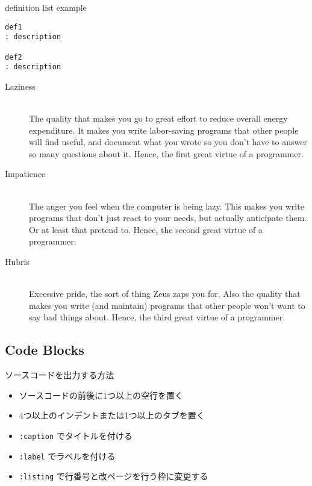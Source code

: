\documentclass[a4j, titlepage]{jarticle}
\begin{document}
\begin{itembox}[c]{definition list example}
\begin{verbatim}
def1
: description

def2
: description
\end{verbatim}
\end{itembox}

\begin{description}
\item[Laziness]\mbox{}\\ The quality that makes you go to great effort to reduce overall energy expenditure. It makes you write labor-saving programs that other people will find useful, and document what you wrote so you don't have to answer so many questions about it. Hence, the first great virtue of a programmer.



\item[Impatience]\mbox{}\\ The anger you feel when the computer is being lazy. This makes you write programs that don't just react to your needs, but actually anticipate them. Or at least that pretend to. Hence, the second great virtue of a programmer.



\item[Hubris]\mbox{}\\ Excessive pride, the sort of thing Zeus zaps you for. Also the quality that makes you write (and maintain) programs that other people won't want to say bad things about. Hence, the third great virtue of a programmer.
\end{description}

\subsection{Code Blocks}

ソースコードを出力する方法

\begin{itemize}
\item ソースコードの前後に1つ以上の空行を置く
\item 4つ以上のインデントまたは1つ以上のタブを置く
\item {\tt :caption} でタイトルを付ける
\item {\tt :label} でラベルを付ける
\item {\tt :listing} で行番号と改ページを行う枠に変更する
\end{itemize}
\end{document}
